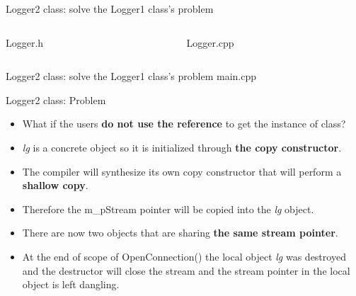 \documentclass[13pt]{beamer}
\begin{document}
\begin{frame}{Logger2 class: solve the Logger1 class's problem}
\begin{columns}[T]
\begin{column}{.48\textwidth}
Logger.h
\lstset{basicstyle=\tiny,style=myCustomCppStyle}

\end{column}

\begin{column}{.48\textwidth}
Logger.cpp
\lstset{basicstyle=\tiny,style=myCustomCppStyle}

\end{column}
\end{columns}
\end{frame}

\begin{frame}{Logger2 class: solve the Logger1 class's problem}
main.cpp
\lstset{basicstyle=\tiny,style=myCustomCppStyle}

\end{frame}

\begin{frame}{Logger2 class: Problem}
\begin{itemize}
\setlength\itemsep{1em}

\item What if the users \textbf{do not use the reference} to get the instance of class?

\item \textit{lg} is a concrete object so it is initialized through \textbf{the copy constructor}.

\item The compiler will synthesize its own copy constructor that will perform a \textbf{shallow copy}.

\item Therefore the m\_pStream pointer will be copied into the \textit{lg} object.

\item There are now two objects that are sharing \textbf{the same stream pointer}.

\item At the end of scope of OpenConnection() the local object \textit{lg} was       destroyed and the destructor will close the stream and the stream pointer in the local object is left dangling.
\end{itemize}
\end{frame}
\end{document}
